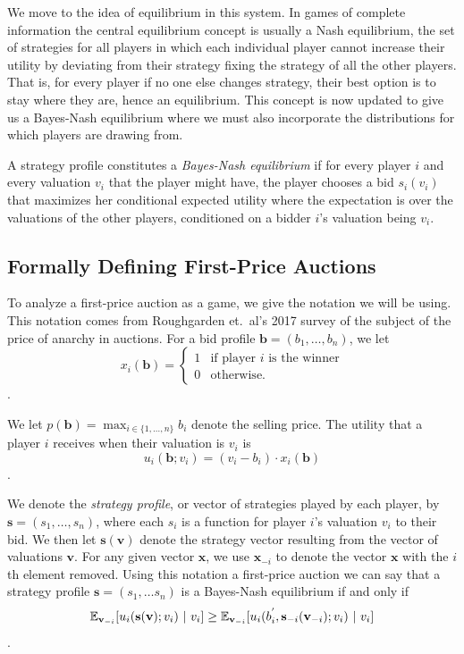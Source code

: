 \documentclass[12pt,twoside]{reedthesis}
\begin{document}
We move to the idea of equilibrium in this system. In games of complete information the central equilibrium concept is usually a Nash equilibrium, the set of strategies for all players in which each individual player cannot increase their utility by deviating from their strategy fixing the strategy of all the other players. That is, for every player if no one else changes strategy, their best option is to stay where they are, hence an equilibrium. This concept is now updated to give us a Bayes-Nash equilibrium where we must also incorporate the distributions for which players are drawing from. 

\begin{dfn}
	A strategy profile constitutes a {\em Bayes-Nash equilibrium} if for every player $i$ and every valuation $v_i$ that the player might have, the player chooses a bid $s_i(v_i)$ that maximizes her conditional expected utility where the expectation is over the valuations of the other players, conditioned on a bidder $i$'s valuation being $v_i$. 
\end{dfn}

\subsection{Formally Defining First-Price Auctions}
To analyze a first-price auction as a game, we give the notation we will be using. This notation comes from Roughgarden et.~al's 2017 survey of the subject of the price of anarchy in auctions. For a bid profile $\textbf{b} = (b_1, \ldots, b_n)$, we let 
\[
	x_i(\textbf{b}) =
	\begin{cases}
		1 & \text{if player $i$ is the winner} \\
		0 & \text{otherwise}.
	\end{cases}
\].

We let $p(\textbf{b}) = \max_{i \in \{1, \ldots, n\} } b_i$ denote the selling price. The utility that a player $i$ receives when their valuation is $v_i$ is 
$$u_i(\textbf{b}; v_i) = (v_i - b_i) \cdot x_i(\textbf{b})$$. 

We denote the {\em strategy profile}, or vector of strategies played by each player, by $\textbf{s} = (s_1, \ldots, s_n)$, where each $s_i$ is a function for player $i$'s valuation $v_i$ to their bid. We then let $\textbf{s}(\textbf{v})$ denote the strategy vector resulting from the vector of valuations $\textbf{v}$. For any given vector $\textbf{x}$, we use $\textbf{x}_{-i}$ to denote the vector $\textbf{x}$ with the $i$th element removed. Using this notation a first-price auction we can say that a strategy profile $\textbf{s} = (s_1, \ldots s_n)$ is a Bayes-Nash equilibrium if and only if 
$$ \mathbb{E}_{\textbf{v}_{-i}} [u_i(\textbf{s} (\textbf{v}); v_i) \ | \ v_i] \geq \mathbb{E}_{\textbf{v}_{-i}} [u_i(b^{'}_i, \textbf{s}_{-i}(\textbf{v}_{-i}); v_i) \ | \ v_i] $$\citep{Roughgarden2017}.
\end{document}
